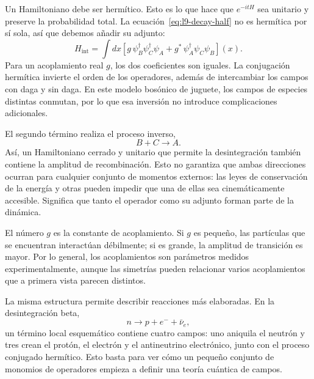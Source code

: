 Un Hamiltoniano debe ser hermítico. Esto es lo que hace que \(e^{-itH}\) sea unitario y preserve la probabilidad total. La ecuación~\eqref{eq:l9-decay-half} no es hermítica por sí sola, así que debemos añadir su adjunto:
\begin{equation}
H_{\mathrm{int}}
=\int dx\left[
g\,\psi_B^\dagger\psi_C^\dagger\psi_A
+g^*\,\psi_A^\dagger\psi_C\psi_B
\right](x).
\label{eq:l9-hermitian-vertex}
\end{equation}
Para un acoplamiento real \(g\), los dos coeficientes son iguales. La conjugación hermítica invierte el orden de los operadores, además de intercambiar los campos con daga y sin daga. En este modelo bosónico de juguete, los campos de especies distintas conmutan, por lo que esa inversión no introduce complicaciones adicionales.

El segundo término realiza el proceso inverso,
\begin{equation}
B+C\longrightarrow A.
\end{equation}
Así, un Hamiltoniano cerrado y unitario que permite la desintegración también contiene la amplitud de recombinación. Esto no garantiza que ambas direcciones ocurran para cualquier conjunto de momentos externos: las leyes de conservación de la energía y otras pueden impedir que una de ellas sea cinemáticamente accesible. Significa que tanto el operador como su adjunto forman parte de la dinámica.

\begin{classroomqa}
\end{classroomqa}

El número \(g\) es la constante de acoplamiento. Si \(g\) es pequeño, las partículas que se encuentran interactúan débilmente; si es grande, la amplitud de transición es mayor. Por lo general, los acoplamientos son parámetros medidos experimentalmente, aunque las simetrías pueden relacionar varios acoplamientos que a primera vista parecen distintos.

La misma estructura permite describir reacciones más elaboradas. En la desintegración beta,
\begin{equation}
n\longrightarrow p+e^-+\bar\nu_e,
\end{equation}
un término local esquemático contiene cuatro campos: uno aniquila el neutrón y tres crean el protón, el electrón y el antineutrino electrónico, junto con el proceso conjugado hermítico. Esto basta para ver cómo un pequeño conjunto de monomios de operadores empieza a definir una teoría cuántica de campos.

